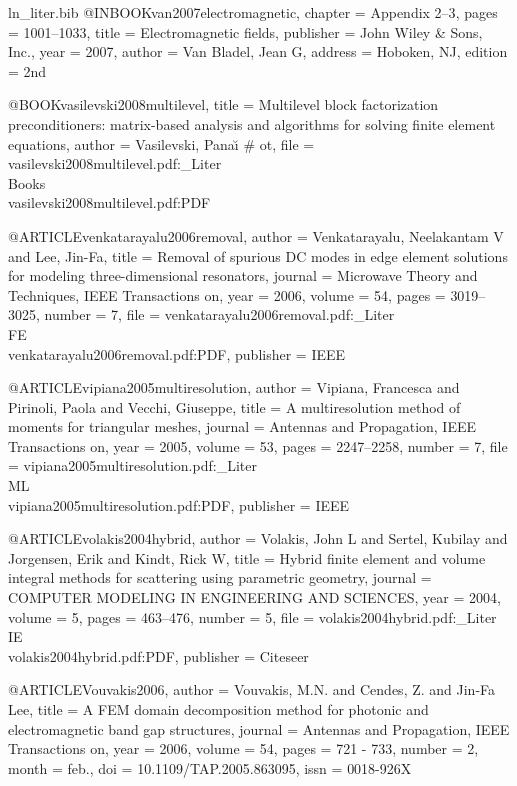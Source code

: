 \begin{filecontents*}{ln_liter.bib}
@INBOOK{van2007electromagnetic,
  chapter = {Appendix 2--3},
  pages = {1001--1033},
  title = {Electromagnetic fields},
  publisher = {John Wiley \& Sons, Inc.},
  year = {2007},
  author = {Van Bladel, Jean G},
  address = {Hoboken, NJ},
  edition = {2nd}
}

@BOOK{vasilevski2008multilevel,
  title = {Multilevel block factorization preconditioners: matrix-based analysis
	and algorithms for solving finite element equations},
  author = {Vasilevski, Pana{\u\i}} # ot,
  file = {vasilevski2008multilevel.pdf:_Liter\\Books\\vasilevski2008multilevel.pdf:PDF}
}

@ARTICLE{venkatarayalu2006removal,
  author = {Venkatarayalu, Neelakantam V and Lee, Jin-Fa},
  title = {Removal of spurious DC modes in edge element solutions for modeling
	three-dimensional resonators},
  journal = {Microwave Theory and Techniques, IEEE Transactions on},
  year = {2006},
  volume = {54},
  pages = {3019--3025},
  number = {7},
  file = {venkatarayalu2006removal.pdf:_Liter\\FE\\venkatarayalu2006removal.pdf:PDF},
  publisher = {IEEE}
}

@ARTICLE{vipiana2005multiresolution,
  author = {Vipiana, Francesca and Pirinoli, Paola and Vecchi, Giuseppe},
  title = {A multiresolution method of moments for triangular meshes},
  journal = {Antennas and Propagation, IEEE Transactions on},
  year = {2005},
  volume = {53},
  pages = {2247--2258},
  number = {7},
  file = {vipiana2005multiresolution.pdf:_Liter\\ML\\vipiana2005multiresolution.pdf:PDF},
  publisher = {IEEE}
}

@ARTICLE{volakis2004hybrid,
  author = {Volakis, John L and Sertel, Kubilay and Jorgensen, Erik and Kindt,
	Rick W},
  title = {Hybrid finite element and volume integral methods for scattering
	using parametric geometry},
  journal = {COMPUTER MODELING IN ENGINEERING AND SCIENCES},
  year = {2004},
  volume = {5},
  pages = {463--476},
  number = {5},
  file = {volakis2004hybrid.pdf:_Liter\\IE\\volakis2004hybrid.pdf:PDF},
  publisher = {Citeseer}
}

@ARTICLE{Vouvakis2006,
  author = {Vouvakis, M.N. and Cendes, Z. and Jin-Fa Lee},
  title = {A {FEM} domain decomposition method for photonic and electromagnetic
	band gap structures},
  journal = {Antennas and Propagation, IEEE Transactions on},
  year = {2006},
  volume = {54},
  pages = {721 - 733},
  number = {2},
  month = {feb.},
  doi = {10.1109/TAP.2005.863095},
  issn = {0018-926X}
}


\end{filecontents*}

